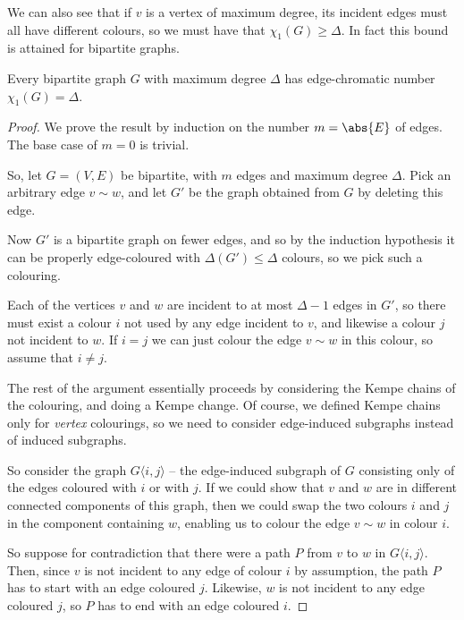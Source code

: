 \documentclass[nobib]{tufte-handout}
\begin{document}
We can also see that if $v$ is a vertex of maximum degree, its incident edges must all have different colours, so we must have that $\chi_1(G) \geq \Delta$. In fact this bound is attained for bipartite graphs.

\begin{theorem}
    Every bipartite graph $G$ with maximum degree $\Delta$ has edge-chromatic number $\chi_1(G) = \Delta$.

    \begin{proof}
        We prove the result by induction on the number $m = \abs{E}$ of edges. The base case of $m = 0$ is trivial.

        So, let $G = (V,E)$ be bipartite, with $m$ edges and maximum degree $\Delta$. Pick an arbitrary edge $v \sim w$, and let $G'$ be the graph obtained from $G$ by deleting this edge.

        Now $G'$ is a bipartite graph on fewer edges, and so by the induction hypothesis it can be properly edge-coloured with $\Delta(G') \leq \Delta$ colours, so we pick such a colouring.

        Each of the vertices $v$ and $w$ are incident to at most $\Delta-1$ edges in $G'$, so there must exist a colour $i$ not used by any edge incident to $v$, and likewise a colour $j$ not incident to $w$. If $i = j$ we can just colour the edge $v \sim w$ in this colour, so assume that $i \neq j$.

        The rest of the argument essentially proceeds by considering the Kempe chains of the colouring, and doing a Kempe change. Of course, we defined Kempe chains only for \emph{vertex} colourings, so we need to consider edge-induced subgraphs instead of induced subgraphs.

        So consider the graph $G\langle i,j\rangle$ -- the edge-induced subgraph of $G$ consisting only of the edges coloured with $i$ or with $j$. If we could show that $v$ and $w$ are in different connected components of this graph, then we could swap the two colours $i$ and $j$ in the component containing $w$, enabling us to colour the edge $v \sim w$ in colour $i$.

        So suppose for contradiction that there were a path $P$ from $v$ to $w$ in $G\langle i,j\rangle$. Then, since $v$ is not incident to any edge of colour $i$ by assumption, the path $P$ has to start with an edge coloured $j$. Likewise, $w$ is not incident to any edge coloured $j$, so $P$ has to end with an edge coloured $i$.


\end{proof}
\end{theorem}
\end{document}
